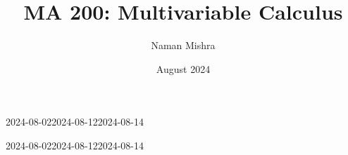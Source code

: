 \documentclass[12pt]{report}
\title{MA 200: Multivariable Calculus}
\author{Naman Mishra}
\date{August 2024}
\begin{document}
\maketitle
\tableofcontents
\newpage
\listoflecture
\listofhw
    
    
    
    
        {2024-08-02}{2024-08-12}{2024-08-14}
    
    
    
    
    
        {2024-08-02}{2024-08-12}{2024-08-14}
\end{document}
